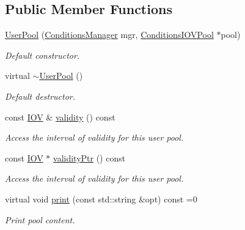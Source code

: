 \subsection*{Public Member Functions}
\begin{DoxyCompactItemize}
\item 
\hyperlink{class_d_d4hep_1_1_conditions_1_1_user_pool_a70dd3921967ca613fe912e90b3139494}{UserPool} (\hyperlink{class_d_d4hep_1_1_conditions_1_1_conditions_manager}{ConditionsManager} mgr, \hyperlink{class_d_d4hep_1_1_conditions_1_1_conditions_i_o_v_pool}{ConditionsIOVPool} $\ast$pool)
\begin{DoxyCompactList}\small\item\em Default constructor. \item\end{DoxyCompactList}\item 
virtual \hyperlink{class_d_d4hep_1_1_conditions_1_1_user_pool_abc62b1465b8e6f40a57c5a2f9819d7eb}{$\sim$UserPool} ()
\begin{DoxyCompactList}\small\item\em Default destructor. \item\end{DoxyCompactList}\item 
const \hyperlink{class_d_d4hep_1_1_i_o_v}{IOV} \& \hyperlink{class_d_d4hep_1_1_conditions_1_1_user_pool_a2f7e5862cd4de0fee5a0a5d1283e2ccf}{validity} () const 
\begin{DoxyCompactList}\small\item\em Access the interval of validity for this user pool. \item\end{DoxyCompactList}\item 
const \hyperlink{class_d_d4hep_1_1_i_o_v}{IOV} $\ast$ \hyperlink{class_d_d4hep_1_1_conditions_1_1_user_pool_abb6fba1bb29215a197f816507826bc00}{validityPtr} () const 
\begin{DoxyCompactList}\small\item\em Access the interval of validity for this user pool. \item\end{DoxyCompactList}\item 
virtual void \hyperlink{class_d_d4hep_1_1_conditions_1_1_user_pool_ab0496fbbd4a84368595d3bbd80c475e3}{print} (const std::string \&opt) const =0
\begin{DoxyCompactList}\small\item\em Print pool content. \item\end{DoxyCompactList}\item 

\end{DoxyCompactItemize}
